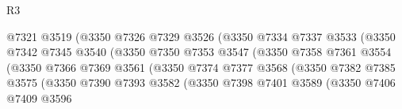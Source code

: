 \begin{lexlean}{R3}
\begin{coremodule}
                                        @7321
                                        @3519
                                        (@3350
                                          @7326
                                          @7329
                                          @3526
                                          (@3350
                                            @7334
                                            @7337
                                            @3533
                                            (@3350
                                              @7342
                                              @7345
                                              @3540
                                              (@3350
                                                @7350
                                                @7353
                                                @3547
                                                (@3350
                                                  @7358
                                                  @7361
                                                  @3554
                                                  (@3350
                                                    @7366
                                                    @7369
                                                    @3561
                                                    (@3350
                                                      @7374
                                                      @7377
                                                      @3568
                                                      (@3350
                                                        @7382
                                                        @7385
                                                        @3575
                                                        (@3350
                                                          @7390
                                                          @7393
                                                          @3582
                                                          (@3350
                                                            @7398
                                                            @7401
                                                            @3589
                                                            (@3350
                                                              @7406
                                                              @7409
                                                              @3596

\end{coremodule}
\end{lexlean}
